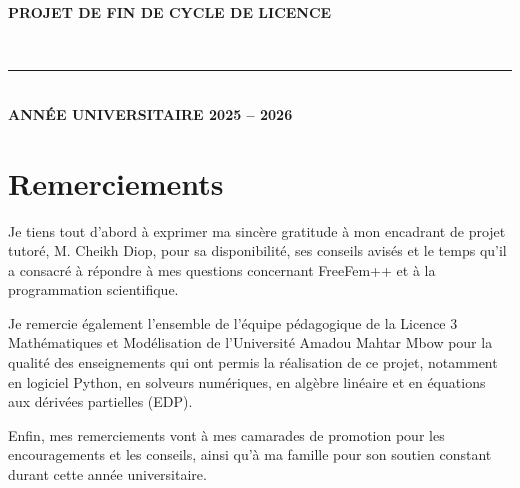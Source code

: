 \documentclass[12pt,a4paper]{article}
\begin{document}
\begin{titlepage}
\begin{center}
			\vspace{0.3cm}
			{\small\bfseries\color{gray!50!black} PROJET DE FIN DE CYCLE DE LICENCE}
			
			\vspace{0.3cm}
			\mbox{%
				\hspace{4mm}%
			}
			
			\vfill
			
			\textcolor{uamBrun}{\rule{5cm}{0.5pt}}\\[0.15cm]
			{\color{uamBleu}\small\bfseries ANNÉE UNIVERSITAIRE 2025 -- 2026}
			\vspace{0.2cm}
		\end{center}
		\restoregeometry
	\end{titlepage}
	\hypersetup{pageanchor=true}
	\setcounter{page}{1}
	\section*{Remerciements}
	
	Je tiens tout d'abord à exprimer ma sincère gratitude à mon encadrant de projet tutoré, M. Cheikh Diop, pour sa disponibilité, ses conseils avisés et le temps qu'il a consacré à répondre à mes questions concernant FreeFem++ et à la programmation scientifique.
	
	Je remercie également l'ensemble de l'équipe pédagogique de la Licence 3 Mathématiques et Modélisation de l'Université Amadou Mahtar Mbow pour la qualité des enseignements qui ont permis la réalisation de ce projet, notamment en logiciel Python, en solveurs numériques, en algèbre linéaire et en équations aux dérivées partielles (EDP).
	
	Enfin, mes remerciements vont à mes camarades de promotion pour les encouragements et les conseils, ainsi qu'à ma famille pour son soutien constant durant cette année universitaire.
	
\end{document}
